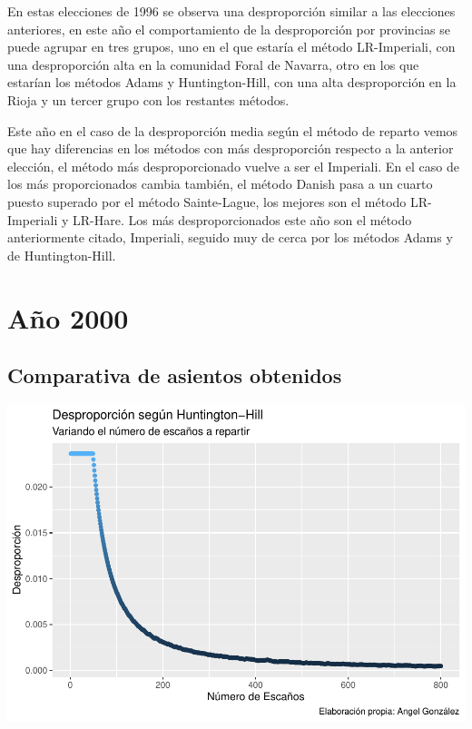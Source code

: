 \documentclass[12pt,a4paper,]{book}
\numberwithin{dummy}{section}
\theoremstyle{ocrenumbox}
\theoremstyle{blacknumex}
\theoremstyle{blacknumbox}
\theoremstyle{ocrenum}
\theoremstyle{ocrenum}
\begin{document}
En estas elecciones de 1996 se observa una desproporción similar a las
elecciones anteriores, en este año el comportamiento de la desproporción
por provincias se puede agrupar en tres grupos, uno en el que estaría el
método LR-Imperiali, con una desproporción alta en la comunidad Foral de
Navarra, otro en los que estarían los métodos Adams y Huntington-Hill,
con una alta desproporción en la Rioja y un tercer grupo con los
restantes métodos.

Este año en el caso de la desproporción media según el método de reparto
vemos que hay diferencias en los métodos con más desproporción respecto
a la anterior elección, el método más desproporcionado vuelve a ser el
Imperiali. En el caso de los más proporcionados cambia también, el
método Danish pasa a un cuarto puesto superado por el método
Sainte-Lague, los mejores son el método LR-Imperiali y LR-Hare. Los más
desproporcionados este año son el método anteriormente citado,
Imperiali, seguido muy de cerca por los métodos Adams y de
Huntington-Hill.

\hypertarget{auxf1o-2000}{%
\section{Año 2000}\label{auxf1o-2000}}

\hypertarget{comparativa-de-asientos-obtenidos-7}{%
\subsection{Comparativa de asientos
obtenidos}\label{comparativa-de-asientos-obtenidos-7}}

\begin{center}\includegraphics[width=1\linewidth]{figurasR/unnamed-chunk-26-1} \end{center}
\end{document}

